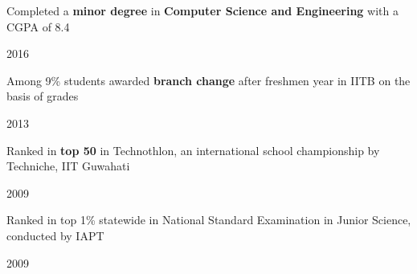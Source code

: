 \begin{cvbulletentries}
%
%
\datedbullet
{ %
    \begin{cvonlybullets}
        \item {Completed a \textbf{minor degree} in \textbf{Computer Science and Engineering} with a CGPA of 8.4}
    \end{cvonlybullets}
}
{ %
    \begin{cvnobullets}
        \item{2016}
    \end{cvnobullets}
}
\datedbullet
{ %
    \begin{cvonlybullets}
        \item {Among 9\% students awarded \textbf{branch change} after freshmen year in IITB on the basis of grades}
    \end{cvonlybullets}
}
{ %
    \begin{cvnobullets}
        \item{2013}
    \end{cvnobullets}
}
\datedbullet
{ %
    \begin{cvonlybullets}
        \item {Ranked in \textbf{top 50} in Technothlon, an international school championship by Techniche, IIT Guwahati}
    \end{cvonlybullets}
}
{ %
    \begin{cvnobullets}
        \item{2009}
    \end{cvnobullets}
}
\datedbullet
{ %
   	\begin{cvonlybullets}
       \item {Ranked in top 1\% statewide in National Standard Examination in Junior Science, conducted by IAPT}
    \end{cvonlybullets}
}
{ %
    \begin{cvnobullets}
        \item {2009}
    \end{cvnobullets}
}
%
\end{cvbulletentries}

